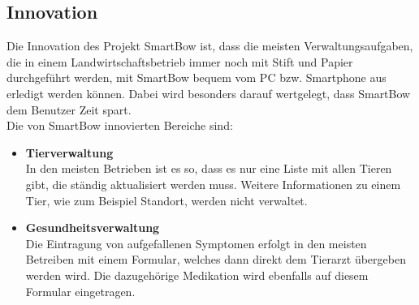 \subsection{Innovation}
Die Innovation des Projekt SmartBow ist, dass die meisten Verwaltungsaufgaben, die in einem Landwirtschaftsbetrieb immer noch mit Stift und Papier durchgeführt werden, mit SmartBow bequem vom PC bzw. Smartphone aus erledigt werden können. Dabei wird besonders darauf wertgelegt, dass SmartBow dem Benutzer Zeit spart.\\
Die von SmartBow innovierten Bereiche sind:
\begin{itemize}
\item \textbf{Tierverwaltung} \\
In den meisten Betrieben ist es so, dass es nur eine Liste mit allen Tieren gibt, die ständig aktualisiert werden muss. Weitere Informationen zu einem Tier, wie zum Beispiel Standort, werden nicht verwaltet.
\item \textbf{Gesundheitsverwaltung} \\
Die Eintragung von aufgefallenen Symptomen erfolgt in den meisten Betreiben mit einem Formular, welches dann direkt dem Tierarzt übergeben werden wird. Die dazugehörige Medikation wird ebenfalls auf diesem Formular eingetragen.
\end{itemize}
